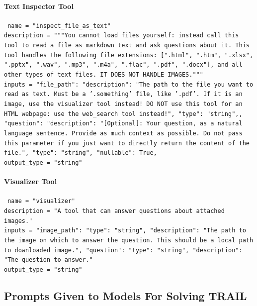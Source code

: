 \documentclass[11pt]{article}
\begin{document}
\paragraph{Text Inspector Tool}
\texttt{\
name = "inspect\_file\_as\_text"\\
description = """You cannot load files yourself: instead call this tool to read a file as markdown text and ask questions about it.
This tool handles the following file extensions: [".html", ".htm", ".xlsx", ".pptx", ".wav", ".mp3", ".m4a", ".flac", ".pdf", ".docx"], and all other types of text files. IT DOES NOT HANDLE IMAGES."""\\
inputs = {"file\_path": {"description": "The path to the file you want to read as text. Must be a '.something' file, like '.pdf'. If it is an image, use the visualizer tool instead! DO NOT use this tool for an HTML webpage: use the web\_search tool instead!", "type": "string",},
"question": {"description": "[Optional]: Your question, as a natural language sentence. Provide as much context as possible. Do not pass this parameter if you just want to directly return the content of the file.", "type": "string", "nullable": True,}}\\
output\_type = "string"}

\paragraph{Visualizer Tool}
\texttt{\
name = "visualizer"\\
description = "A tool that can answer questions about attached images."\\
inputs = {"image\_path": {"type": "string", "description": "The path to the image on which to answer the question. This should be a local path to downloaded image."},
"question": {"type": "string", "description": "The question to answer."}}\\
output\_type = "string"}

\subsection{Prompts Given to Models For Solving TRAIL}
\label{appendix_subsec:model_prompt_trail}
\end{document}
